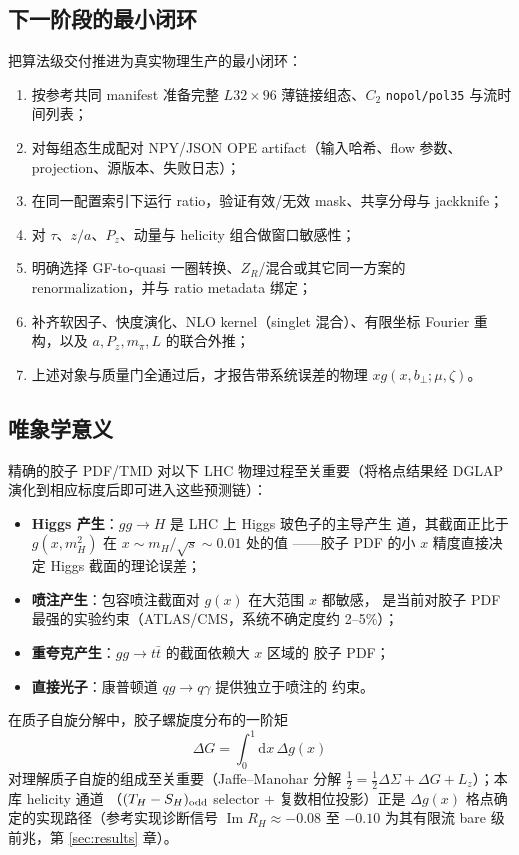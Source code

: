 \documentclass[11pt,a4paper]{ctexart}
\newcommand{\code}[1]{\texttt{#1}}
\newcommand{\bperp}{b_{\perp}}
\begin{document}
\subsection{下一阶段的最小闭环}

把算法级交付推进为真实物理生产的最小闭环：
\begin{enumerate}
  \item 按参考共同 manifest 准备完整 $L32\times96$ 薄链接组态、$C_2$
  \code{nopol/pol35} 与流时间列表；
  \item 对每组态生成配对 NPY/JSON OPE artifact（输入哈希、flow 参数、
  projection、源版本、失败日志）；
  \item 在同一配置索引下运行 ratio，验证有效/无效 mask、共享分母与
  jackknife；
  \item 对 $\tau$、$z/a$、$P_z$、动量与 helicity 组合做窗口敏感性；
  \item 明确选择 GF-to-quasi 一圈转换、$Z_R$/混合或其它同一方案的
  renormalization，并与 ratio metadata 绑定；
  \item 补齐软因子、快度演化、NLO kernel（singlet 混合）、有限坐标
  Fourier 重构，以及 $a,P_z,m_\pi,L$ 的联合外推；
  \item 上述对象与质量门全通过后，才报告带系统误差的物理
  $xg(x,\bperp;\mu,\zeta)$。
\end{enumerate}

\subsection{唯象学意义}
\label{sec:phenomenology}

精确的胶子 PDF/TMD 对以下 LHC 物理过程至关重要（将格点结果经 DGLAP
演化到相应标度后即可进入这些预测链）：
\begin{itemize}
  \item \textbf{Higgs 产生}：$gg\to H$ 是 LHC 上 Higgs 玻色子的主导产生
  道，其截面正比于 $g(x,m_H^2)$ 在 $x\sim m_H/\sqrt{s}\sim0.01$ 处的值
  ——胶子 PDF 的小 $x$ 精度直接决定 Higgs 截面的理论误差；
  \item \textbf{喷注产生}：包容喷注截面对 $g(x)$ 在大范围 $x$ 都敏感，
  是当前对胶子 PDF 最强的实验约束（ATLAS/CMS，系统不确定度约
  2--5\%）；
  \item \textbf{重夸克产生}：$gg\to t\bar t$ 的截面依赖大 $x$ 区域的
  胶子 PDF；
  \item \textbf{直接光子}：康普顿道 $qg\to q\gamma$ 提供独立于喷注的
  约束。
\end{itemize}
在质子自旋分解中，胶子螺旋度分布的一阶矩
\begin{equation}
\Delta G = \int_0^1\mathrm{d}x\,\Delta g(x)
\end{equation}
对理解质子自旋的组成至关重要（Jaffe--Manohar 分解
$\frac12=\frac12\Delta\Sigma+\Delta G+L_z$）；本库 helicity 通道
（$(T_H-S_H)_{\rm odd}$ selector + 复数相位投影）正是 $\Delta g(x)$
格点确定的实现路径（参考实现诊断信号 $\operatorname{Im}R_H\approx
-0.08$ 至 $-0.10$ 为其有限流 bare 级前兆，第 \ref{sec:results} 章）。
\end{document}
